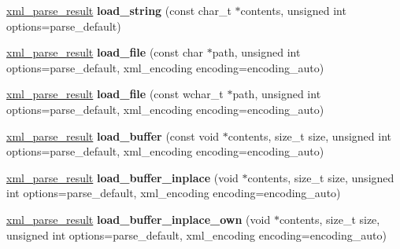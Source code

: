 \begin{DoxyCompactItemize}
\item 
\hypertarget{classpugi_1_1xml__document_a706a276ee3d5010f2bb8c7eacb75a891}{}\hyperlink{structpugi_1_1xml__parse__result}{xml\+\_\+parse\+\_\+result} {\bfseries load\+\_\+string} (const char\+\_\+t $\ast$contents, unsigned int options=parse\+\_\+default)\label{classpugi_1_1xml__document_a706a276ee3d5010f2bb8c7eacb75a891}

\item 
\hypertarget{classpugi_1_1xml__document_aad350209a4a91589fbd7e8cdaf79e010}{}\hyperlink{structpugi_1_1xml__parse__result}{xml\+\_\+parse\+\_\+result} {\bfseries load\+\_\+file} (const char $\ast$path, unsigned int options=parse\+\_\+default, xml\+\_\+encoding encoding=encoding\+\_\+auto)\label{classpugi_1_1xml__document_aad350209a4a91589fbd7e8cdaf79e010}

\item 
\hypertarget{classpugi_1_1xml__document_ac5a29d9c9e754120a5e0c072b332a25a}{}\hyperlink{structpugi_1_1xml__parse__result}{xml\+\_\+parse\+\_\+result} {\bfseries load\+\_\+file} (const wchar\+\_\+t $\ast$path, unsigned int options=parse\+\_\+default, xml\+\_\+encoding encoding=encoding\+\_\+auto)\label{classpugi_1_1xml__document_ac5a29d9c9e754120a5e0c072b332a25a}

\item 
\hypertarget{classpugi_1_1xml__document_ab29840790e26b2166a395c63a2b2d9bd}{}\hyperlink{structpugi_1_1xml__parse__result}{xml\+\_\+parse\+\_\+result} {\bfseries load\+\_\+buffer} (const void $\ast$contents, size\+\_\+t size, unsigned int options=parse\+\_\+default, xml\+\_\+encoding encoding=encoding\+\_\+auto)\label{classpugi_1_1xml__document_ab29840790e26b2166a395c63a2b2d9bd}

\item 
\hypertarget{classpugi_1_1xml__document_a3e20650182ccbdd175ca069dd5e08632}{}\hyperlink{structpugi_1_1xml__parse__result}{xml\+\_\+parse\+\_\+result} {\bfseries load\+\_\+buffer\+\_\+inplace} (void $\ast$contents, size\+\_\+t size, unsigned int options=parse\+\_\+default, xml\+\_\+encoding encoding=encoding\+\_\+auto)\label{classpugi_1_1xml__document_a3e20650182ccbdd175ca069dd5e08632}

\item 
\hypertarget{classpugi_1_1xml__document_a9da4bdcdc4ad914fb0f4680b02983502}{}\hyperlink{structpugi_1_1xml__parse__result}{xml\+\_\+parse\+\_\+result} {\bfseries load\+\_\+buffer\+\_\+inplace\+\_\+own} (void $\ast$contents, size\+\_\+t size, unsigned int options=parse\+\_\+default, xml\+\_\+encoding encoding=encoding\+\_\+auto)\label{classpugi_1_1xml__document_a9da4bdcdc4ad914fb0f4680b02983502}


\end{DoxyCompactItemize}
